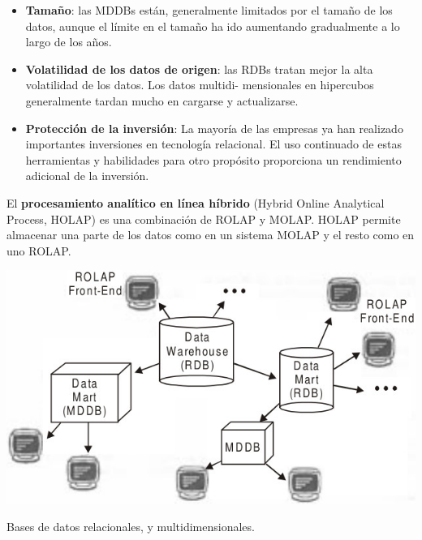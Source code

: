 \documentclass{fancyslides}
\begin{document}
\begin{frame}
\misc
{
\begin{itemize}
  \item \textbf{Tamaño}: las MDDBs están, generalmente limitados por el tamaño de los datos, aunque el límite en el tamaño ha ido aumentando gradualmente a lo largo de los años.
  \item \textbf{Volatilidad de los datos de origen}: las RDBs tratan mejor la alta volatilidad de los datos. Los datos multidi- mensionales en hipercubos generalmente tardan mucho en cargarse y actualizarse.
  \item \textbf{Protección de la inversión}: La mayoría de las empresas ya han realizado importantes inversiones en tecnología relacional.
  El uso continuado de estas herramientas y habilidades para otro propósito proporciona un rendimiento adicional de la inversión.
\end{itemize}
}
\end{frame}

\begin{frame}
\end{frame}

\begin{frame}
\misc
{
El \textbf{procesamiento analítico en línea híbrido} (Hybrid Online Analytical Process, HOLAP) es una combinación de ROLAP y MOLAP. HOLAP permite almacenar una parte de los datos como en un sistema MOLAP y el resto como en uno ROLAP.
}
\end{frame}

\begin{frame}
\misc
{
  \begin{center}
  \includegraphics[scale=0.4]{RDB&MDDB3}
  
  Bases de datos relacionales, y multidimensionales.
  \end{center}
}
\end{frame}

\begin{frame}
\end{frame}
\end{document}
